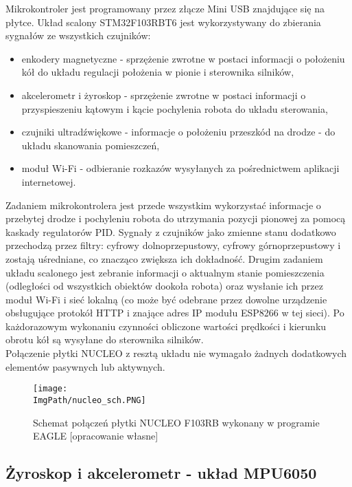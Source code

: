 \documentclass[a4paper,12pt,twoside,openany]{report}
\newcommand{\ImgPath}{.}
\begin{document}
Mikrokontroler jest programowany przez złącze Mini USB znajdujące się na płytce. Układ scalony STM32F103RBT6 jest wykorzystywany do zbierania sygnałów ze wszystkich czujników:
\begin{itemize}
\item enkodery magnetyczne - sprzężenie zwrotne w postaci informacji o położeniu kół do układu regulacji położenia w pionie i sterownika silników,
\item akcelerometr i żyroskop - sprzężenie zwrotne w postaci informacji o przyspieszeniu kątowym i kącie pochylenia robota do układu sterowania,
\item czujniki ultradźwiękowe - informacje o położeniu przeszkód na drodze - do układu skanowania pomieszczeń,
\item moduł Wi-Fi - odbieranie rozkazów wysyłanych za pośrednictwem aplikacji internetowej.
\end{itemize}

Zadaniem mikrokontrolera jest przede wszystkim wykorzystać informacje o przebytej drodze i pochyleniu robota do utrzymania pozycji pionowej za pomocą kaskady regulatorów PID. Sygnały z czujników jako zmienne stanu dodatkowo przechodzą przez filtry: cyfrowy dolnoprzepustowy, cyfrowy górnoprzepustowy i zostają uśredniane, co znacząco zwiększa ich dokładność. Drugim zadaniem układu scalonego jest zebranie informacji o aktualnym stanie pomieszczenia (odległości od wszystkich obiektów dookoła robota) oraz wysłanie ich przez moduł Wi-Fi i sieć lokalną (co może być odebrane przez dowolne urządzenie obsługujące protokół HTTP i znające adres IP modułu ESP8266 w tej sieci). Po każdorazowym wykonaniu czynności obliczone wartości prędkości i kierunku obrotu kół są wysyłane do sterownika silników.\\
Połączenie płytki NUCLEO z resztą układu nie wymagało żadnych dodatkowych elementów pasywnych lub aktywnych.

\begin{figure}[!htbp]
	\begin{center}
\centering
\texttt{[image: \\ImgPath/nucleo\_sch.PNG]}
\end{center}
	\caption{Schemat połączeń płytki NUCLEO F103RB wykonany w programie EAGLE [opracowanie własne]}
	\label{schematKomunikacji}
\end{figure}

\newpage

\subsection{Żyroskop i akcelerometr - układ MPU6050}
\end{document}
